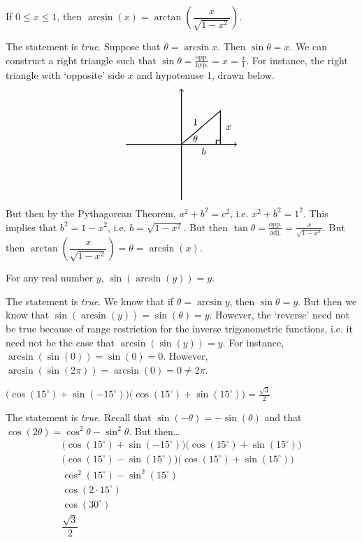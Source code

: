 \documentclass[11pt,letterpaper]{article}
\begin{document}
 If $0 \leq x \leq 1$, then $\arcsin(x)= \arctan \left( \dfrac{x}{\sqrt{1 - x^2}} \right)$. \pspace

\sol The statement is \textit{true}. Suppose that $\theta= \arcsin x$. Then $\sin \theta= x$. We can construct a right triangle such that $\sin \theta= \frac{\text{opp.}}{\text{hyp.}}= x= \frac{x}{1}$. For instance, the right triangle with `opposite' side $x$ and hypotenuse 1, drawn below. 
	\[
	\begin{tikzpicture}
	\draw[line width=0.03cm,->] (-2,0) -- (2,0);				%
	\draw[line width=0.03cm,->] (0,-2) -- (0,2);				%
	
	\node at (0.5,0.2) {$\theta$};
	\draw[line width=0.03cm] (0,0) -- (1.4,1.2) -- (1.4,0);			%
	\draw[line width=0.03cm] (1.25,0) -- (1.25,0.15) -- (1.4,0.15);	%
	
	\node at (0.8,-0.25) {$b$};
	\node at (1.7,0.6) {$x$};
	\node at (0.5,0.8) {$1$};
	\end{tikzpicture}
	\]
But then by the Pythagorean Theorem, $a^2 + b^2= c^2$, i.e. $x^2 + b^2= 1^2$. This implies that $b^2= 1 - x^2$, i.e. $b= \sqrt{1 - x^2}$. But then $\tan \theta= \frac{\text{opp.}}{\text{adj.}}= \frac{x}{\sqrt{1 - x^2}}$. But then $\arctan \left( \dfrac{x}{\sqrt{1 - x^2}} \right)= \theta= \arcsin(x)$.  \pvspace{1.3cm}



 For any real number $y$, $\sin(\arcsin(y) )= y$. \pspace

\sol The statement is \textit{true}. We know that if $\theta= \arcsin y$, then $\sin \theta= y$. But then we know that $\sin(\arcsin(y) )= \sin(\theta)= y$. However, the `reverse' need not be true because of range restriction for the inverse trigonometric functions, i.e. it need not be the case that $\arcsin(\sin(y) )= y$. For instance, $\arcsin(\sin(0) )= \sin(0)= 0$. However, $\arcsin(\sin(2\pi) )= \arcsin(0)= 0 \neq 2 \pi$. \pvspace{1.3cm}



 $\big( \cos(15^\circ) + \sin(-15^\circ) \big) \big( \cos(15^\circ) + \sin(15^\circ) \big)= \frac{\sqrt{3}}{2}$ \pspace

\sol The statement is \textit{true}. Recall that $\sin(-\theta)= -\sin(\theta)$ and that $\cos(2\theta)= \cos^2 \theta - \sin^2 \theta$. But then\dots
	\[
	\begin{gathered}
	\big( \cos(15^\circ) + \sin(-15^\circ) \big) \big( \cos(15^\circ) + \sin(15^\circ) \big) \\[0.3cm]
	\big( \cos(15^\circ) - \sin(15^\circ) \big) \big( \cos(15^\circ) + \sin(15^\circ) \big) \\[0.3cm]
	\cos^2(15^\circ) - \sin^2(15^\circ) \\[0.3cm]
	\cos(2 \cdot 15^\circ) \\[0.3cm]
	\cos(30^\circ) \\[0.3cm]
	\dfrac{\sqrt{3}}{2}
	\end{gathered}
	\]
\end{document}
